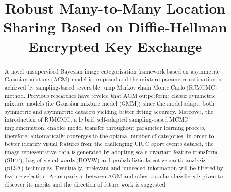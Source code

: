 \documentclass[conference]{IEEEtran}
\begin{document}
\title{Robust Many-to-Many Location Sharing Based on Diffie-Hellman Encrypted Key Exchange \\
}


\maketitle

\begin{abstract}
A novel unsupervised Bayesian image categorization framework based on asymmetric Gaussian mixture (AGM) model is proposed and the mixture parameter estimation is achieved by sampling-based reversible jump Markov chain Monte Carlo (RJMCMC) method. Previous researches have reveled that AGM outperforms classic symmetric mixture models (i.e Gaussian mixture model (GMM)) since the model adapts both symmetric and asymmetric datasets yielding better fitting accuracy. Moreover, the introduction of RJMCMC, a hybrid self-adapted sampling-based MCMC implementation, enables model transfer throughout parameter learning process, therefore, automatically converges to the optimal number of categories. In order to better identify visual features from the challenging UIUC sport events dataset, the image representative data is generated by adopting scale-invariant feature transform (SIFT), bag-of-visual-words (BOVW) and probabilistic latent semantic analysis (pLSA) techniques. Eventually, irrelevant and unneeded information will be filtered by feature selection. A comparison between AGM and other popular classifiers is given to discover its merits and the direction of future work is suggested.
\end{abstract}
\end{document}
